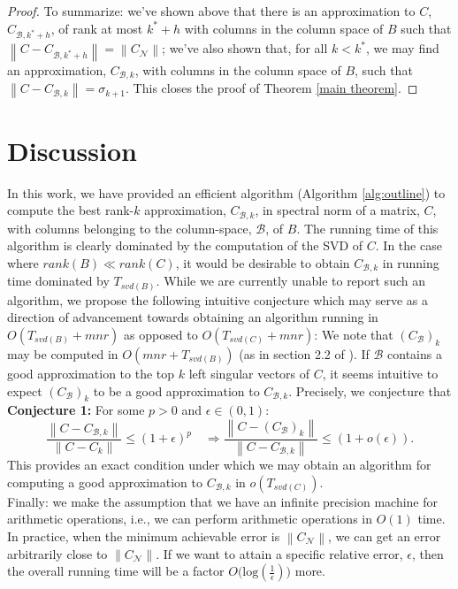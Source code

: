 \documentclass[11pt]{article}
\newcommand{\norm}[1]{\left\|#1\right\|}
\newcommand{\B}{\mathcal{B}}
\newcommand{\N}{\mathcal{N}}
\newcommand{\0}{\ensuremath{\mathbf{0}}}
\renewcommand{\>}{\succ}
\newcommand{\<}{\prec}
\begin{document}
\begin{proof}
\noindent To summarize: we've shown above that there is an approximation to $C$, $C_{\B, k^* + h}$, of rank at most $k^* + h$ with columns in the column space of $B$ such that $\norm{C - C_{\B, k^* + h}} = \norm{C_{\N}}$; we've also shown that, for all $k < k^*$, we may find an approximation, $C_{\B, k}$, with columns in the column space of $B$, such that $\norm{C - C_{\B, k}} = \sigma_{k+1}$. This closes the proof of Theorem \ref{main theorem}.
\end{proof}

\section{Discussion}
In this work, we have provided an efficient algorithm (Algorithm \ref{alg:outline}) to compute the best rank-$k$ approximation, $C_{\B, k}$, in spectral norm of a matrix, $C$, with columns belonging to the column-space, $\B$, of $B$. The running time of this algorithm is clearly dominated by the computation of the SVD of $C$. In the case where $rank(B) \ll rank(C)$, it would be desirable to obtain $C_{\B, k}$ in running time dominated by $T_{svd(B)}$. While we are currently unable to report such an algorithm, we propose the following intuitive conjecture which may serve as a direction of advancement towards obtaining an algorithm running in $O(T_{svd(B)} + mnr)$ as opposed to $O(T_{svd(C)} + mnr)$: We note that $(C_{\B})_k$ may be computed in $O(mnr + T_{svd(B)})$ (as in section 2.2 of \cite{BDM}). If $\B$ contains a good approximation to the top $k$ left singular vectors of $C$, it seems intuitive to expect $(C_{\B})_k$ to be a good approximation to $C_{\B, k}$. Precisely, we conjecture that\\
\textbf{Conjecture 1:} For some $p > 0$ and $\epsilon \in (0, 1)$:\\
\[ \frac{\norm{{C} - C_{\B, k}}}{\norm{C - C_k}} \leq (1+\epsilon)^p \quad \Rightarrow
\frac{\norm{{C} - (C_{\B})_k} }{\norm{C - C_{\B, k}}}\leq (1+o(\epsilon)). \]
This provides an exact condition under which we may obtain an algorithm for computing a good approximation to $C_{\B, k}$ in $o(T_{svd(C)})$.\\

Finally: we make the assumption that we have an infinite precision machine for arithmetic operations, i.e., we can perform arithmetic operations in $O(1)$ time. In practice, when the minimum achievable error is $\norm{C_{\N}}$, we can get an error arbitrarily close to $\norm{C_{\N}}$. If we want to attain a specific relative error, $\epsilon$,  then the overall running time will be a factor $O\Big(\text{log}(\frac{1}{\epsilon})\Big)$ more.  

\end{document}
